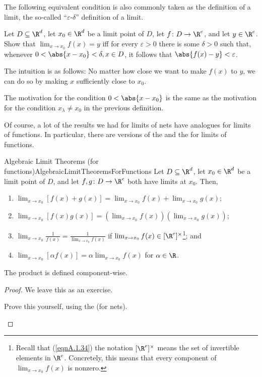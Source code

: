 The following equivalent condition is also commonly taken as the definition of a limit, the so-called ``$\varepsilon$-$\delta$'' definition of a limit.
\begin{exr}{}{}
Let $D\subseteq \R ^d$, let $x_0\in \R ^d$ be a limit point of $D$, let $f\colon D\rightarrow \R ^e$, and let $y\in \R ^e$.  Show that $\lim _{x\to x_0}f(x)=y$ iff for every $\varepsilon >0$ there is some $\delta >0$ such that, whenever $0<\abs{x-x_0}<\delta, x\in D$, it follows that $\abs{f(x)-y}<\varepsilon$.
\begin{rmk}
The intuition is as follows:  No matter how close we want to make $f(x)$ to $y$, we can do so by making $x$ sufficiently close to $x_0$.
\end{rmk}
\begin{rmk}
The motivation for the condition $0<\abs{x-x_0}$ is the same as the motivation for the condition $x_\lambda \neq x_0$ in the previous definition.
\end{rmk}
\end{exr}
Of course, a lot of the results we had for limits of nets have analogues for limits of functions.  In particular, there are versions of the  and the  for limits of functions.
\begin{prp}{Algebraic Limit Theorems (for \\ functions)}{AlgebraicLimitTheoremsForFunctions}
Let $D\subseteq \R ^d$, let $x_0\in \R ^d$ be a limit point of $D$, and let $f,g\colon D\rightarrow \R ^e$ both have limits at $x_0$.  Then,
\begin{enumerate}
\item $\lim _{x\to x_0}[f(x)+g(x)]=\lim _{x\to x_0}f(x)+\lim _{x\to x_0}g(x)$;
\item $\lim _{x\to x_0}[f(x)g(x)]=\left( \lim _{x\to x_0}f(x)\right) \left( \lim _{x\to x_0}g(x)\right)$;
\item $\lim _{x\to x_0}\frac{1}{f(x)}=\frac{1}{\lim _{x\to x_0}f(x)}$ if $\lim _{x\to x_0}f(x)\in [\R ^e]^{\times}$\footnote{Recall that (\eqref{eqnA.1.34}) the notation $[\R ^e]^{\times}$ means the set of invertible elements in $\R ^e$.  Concretely, this means that every component of $\lim _{x\to x_0}f(x)$ is nonzero.}; and
\item $\lim _{x\to x_0}[\alpha f(x)]=\alpha \lim _{x\to x_0}f(x)$ for $\alpha \in \R$.
\end{enumerate}
\begin{rmk}
The product is defined component-wise.
\end{rmk}
\begin{proof}
We leave this as an exercise.
\begin{exr}[breakable=false]{}{}
Prove this yourself, using the  (for nets).
\end{exr}
\end{proof}
\end{prp}
